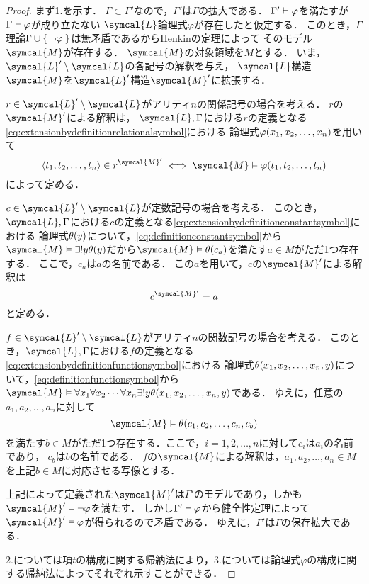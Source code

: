 \begin{proof}
	まず1.を示す．
	\(\Gamma \subset \Gamma'\)なので，\(\Gamma'\)は\(\Gamma\)の拡大である．
	\(\Gamma' \vdash \varphi\)を満たすが\(\Gamma \vdash \varphi\)が成り立たない
	\(\symcal{L}\)論理式\(\varphi\)が存在したと仮定する．
	このとき，\(\Gamma\)理論\(\Gamma \cup \Set{\lnot \varphi}\)は無矛盾であるからHenkinの定理によって
	そのモデル\(\symcal{M}\)が存在する．
	\(\symcal{M}\)の対象領域を\(M\)とする．
	いま，\(\symcal{L}' \setminus \symcal{L}\)の各記号の解釈を与え，
	\(\symcal{L}\)構造\(\symcal{M}\)を\(\symcal{L}'\)構造\(\symcal{M}'\)に拡張する．

	\(r \in \symcal{L}' \setminus \symcal{L}\)がアリティ\(n\)の関係記号の場合を考える．
	\(r\)の\(\symcal{M}'\)による解釈は，
	\(\symcal{L}, \Gamma\)における\(r\)の定義となる\cref{eq:extensionbydefinitionrelationalsymbol}における
	論理式\(\apply{\varphi}{x_1, x_2, \dots, x_n}\)を用いて
	\[
		\pair{t_1, t_2, \dots, t_n} \in \interpretation{\symcal{M}'}{r} \metaequivalent \symcal{M} \satisfy \apply{\varphi}{t_1, t_2, \dots, t_n}
	\]
	によって定める．

	\(c \in \symcal{L}' \setminus \symcal{L}\)が定数記号の場合を考える．
	このとき，\(\symcal{L}, \Gamma\)における\(c\)の定義となる\cref{eq:extensionbydefinitionconstantsymbol}における
	論理式\(\apply{\theta}{y}\)について，\cref{eq:definitionconstantsymbol}から
	\(\symcal{M} \satisfy \uexists y \apply{\theta}{y}\)だから\(\symcal{M} \satisfy \apply{\theta}{c_a}\)を満たす\(a \in M\)がただ1つ存在する．
	ここで，\(c_a\)は\(a\)の名前である．
	この\(a\)を用いて，\(c\)の\(\symcal{M}'\)による解釈は
	\[
		\interpretation{\symcal{M}'}{c} = a
	\]
	と定める．

	\(f \in \symcal{L}' \setminus \symcal{L}\)がアリティ\(n\)の関数記号の場合を考える．
	このとき，\(\symcal{L}, \Gamma\)における\(f\)の定義となる\cref{eq:extensionbydefinitionfunctionsymbol}における
	論理式\(\apply{\theta}{x_1, x_2, \dots, x_n, y}\)について，\cref{eq:definitionfunctionsymbol}から
	\(\symcal{M} \satisfy \forall x_1 \forall x_2 \dotsb \forall x_n \uexists y \apply{\theta}{x_1, x_2, \dots, x_n, y}\)である．
	ゆえに，任意の\(a_1, a_2, \dots, a_n\)に対して
	\[
		\symcal{M} \satisfy \apply{\theta}{c_1, c_2, \dots, c_n, c_b}
	\]
	を満たす\(b \in M\)がただ1つ存在する．ここで，\(i = 1, 2, \dots, n\)に対して\(c_i\)は\(a_i\)の名前であり，
	\(c_b\)は\(b\)の名前である．
	\(f\)の\(\symcal{M}\)による解釈は，\(a_1, a_2, \dots, a_n \in M\)を上記\(b \in M\)に対応させる写像とする．

	上記によって定義された\(\symcal{M}'\)は\(\Gamma'\)のモデルであり，しかも\(\symcal{M}' \satisfy \lnot \varphi\)を満たす．
	しかし\(\Gamma' \vdash \varphi\)から健全性定理によって\(\symcal{M}' \satisfy \varphi\)が得られるので矛盾である．
	ゆえに，\(\Gamma'\)は\(\Gamma\)の保存拡大である．

	2.については項\(t\)の構成に関する帰納法により，3.については論理式\(\varphi\)の構成に関する帰納法によってそれぞれ示すことができる．
\end{proof}


